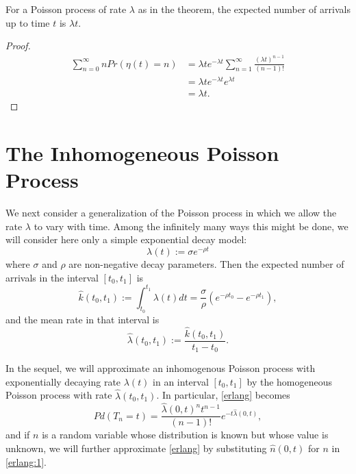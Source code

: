 \documentclass[12pt,leqno]{article}
\begin{document}
\begin{Cor}
  For a Poisson process of rate $\lambda$ as in the theorem, 
  the expected number of arrivals up to time $t$ is $\lambda{t}$.
  \begin{proof}
    \begin{align*}
      \sum_{n=0}^{\infty}nPr(\eta(t) = n) &= \lambda{t}e^{-\lambda{t}}\sum_{n=1}^{\infty}\frac{(\lambda{t})^{n-1}}{(n-1)!}\\
      &=\lambda{t}e^{-\lambda{t}}e^{\lambda{t}}\\
      &= \lambda{t}.
    \end{align*}
  \end{proof}
\end{Cor}
        
   
\section{The Inhomogeneous Poisson Process}
We next consider a generalization of the Poisson process in which we allow the rate $\lambda$ to vary with time.
Among the infinitely many ways this might be done, we will consider here only a simple exponential decay model:
\begin{equation}\label{exp_rate}
  \lambda(t) := {\sigma}e^{-\rho{t}}
\end{equation}
where $\sigma$ and $\rho$ are non-negative decay parameters.
Then the expected number of arrivals in the interval $[t_0,t_1]$ is
\begin{equation}\label{k_hat}
  \hat{k}(t_0,t_1) := \int_{t_0}^{t_1}\lambda(t)dt = \frac{\sigma}{\rho}(e^{-\rho{t_0}}- e^{-\rho{t_1}}),
\end{equation}
and the mean rate in that interval is
\begin{equation}\label{lambda_hat}
  \hat{\lambda}(t_0,t_1) := \frac{\hat{k}(t_0,t_1)}{t_1 - t_0}.
\end{equation}

In the sequel, we will approximate an inhomogenous Poisson process with exponentially decaying rate $\lambda(t)$
in an interval $[t_0,t_1]$ by the homogeneous Poisson process with rate $\hat{\lambda}(t_0,t_1)$.  In particular,
\eqref{erlang} becomes
\begin{equation}\label{erlang:1}
  Pd(T_n = t) = \frac{\hat{\lambda}(0,t)^nt^{n-1}}{(n-1)!}e^{-t\hat{\lambda}(0,t)},
\end{equation}
and if $n$ is a random variable whose distribution is known but whose value is unknown, we will further approximate
\eqref{erlang} by substituting $\hat{n}(0,t)$ for $n$ in \eqref{erlang:1}.
\end{document}
